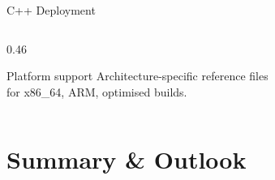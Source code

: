 \documentclass[aspectratio=169, 11pt]{beamer}
\begin{document}
\begin{frame}{C++ Deployment}
\begin{columns}[T]
\begin{column}{0.46\textwidth}

  \vspace{6pt}
  \begin{block}{Platform support}
    Architecture-specific reference files\\
    for x86\_64, ARM, optimised builds.
  \end{block}
\end{column}
\end{columns}
\end{frame}


\section{Summary \& Outlook}
\end{document}
